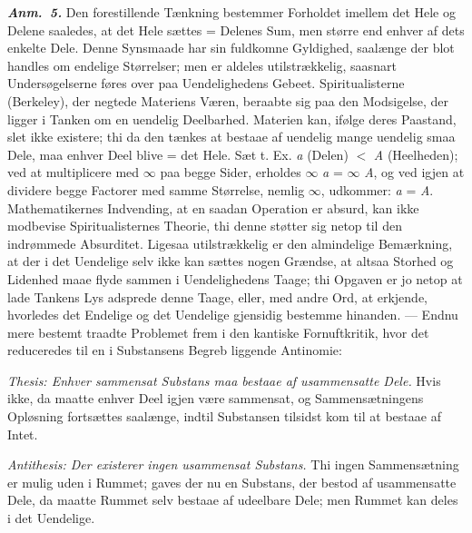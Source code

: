 \documentclass[12pt]{book}
\newcommand{\anm}[1]{\emph{\textbf{Anm.~#1.}}}
\newcommand{\opage}[1]{\marginnote{\footnotesize\textit{[#1]}}}
\begin{document}
\anm{5} Den forestillende Tænkning bestemmer Forholdet imellem det Hele og
Delene saaledes, at det Hele sættes = Delenes Sum, men større end enhver af
dets enkelte Dele. Denne Synsmaade har sin fuldkomne Gyldighed, saalænge der
blot handles om endelige Størrelser; men er aldeles utilstrækkelig, saasnart
Undersøgelserne føres over paa Uendelighedens Gebeet. Spiritualisterne
(Berkeley), der negtede Materiens Væren, beraabte sig paa den Modsigelse, der
ligger i Tanken om en uendelig Deelbarhed. Materien kan, ifølge deres
Paastand, slet ikke existere; thi da den tænkes at bestaae af uendelig mange
uendelig smaa Dele, maa enhver Deel blive = det Hele. Sæt t. Ex. \textit{a}
(Delen) $<$ \textit{A} (Heelheden); ved at multiplicere med $\infty$ paa begge
Sider, erholdes $\infty$ \textit{a} = $\infty$ \textit{A}, og ved igjen at
dividere begge Factorer med samme Størrelse, nemlig $\infty$, udkommer:
\textit{a} = \textit{A}. Mathematikernes Indvending, at en saadan Operation er
absurd, kan ikke modbevise Spiritualisternes Theorie, thi denne støtter sig
netop til den indrømmede Absurditet. Ligesaa utilstrækkelig er den almindelige
Bemærkning, at der i det Uendelige selv ikke kan sættes nogen Grændse, at
altsaa Storhed og Lidenhed maae flyde sammen i Uendelighedens Taage; thi
Opgaven er jo netop at lade Tankens Lys adsprede denne Taage, eller, med andre
Ord, at erkjende, hvorledes det Endelige og det Uendelige gjensidig bestemme
hinanden. --- Endnu mere bestemt traadte Problemet frem i den kantiske
Fornuftkritik, hvor det reduceredes til en i Substansens Begreb liggende
Antinomie:

\opage{19} \emph{Thesis: Enhver sammensat Substans maa bestaae af usammensatte Dele.}
Hvis ikke, da maatte enhver Deel igjen være sammensat, og Sammensætningens
Opløsning fortsættes saalænge, indtil Substansen tilsidst kom til at bestaae
af Intet.

\emph{Antithesis: Der existerer ingen usammensat Substans.} Thi ingen
Sammensætning er mulig uden i Rummet; gaves der nu en Substans, der bestod af
usammensatte Dele, da maatte Rummet selv bestaae af udeelbare Dele; men Rummet
kan deles i det Uendelige.
\end{document}
